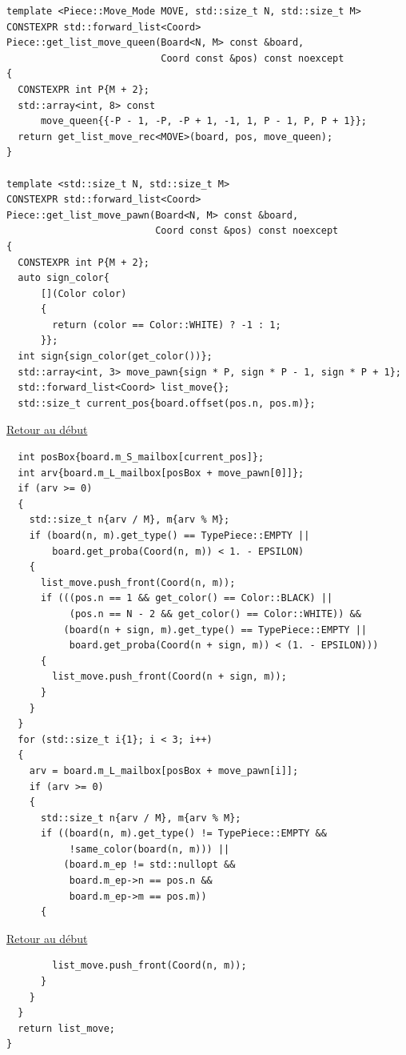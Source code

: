 {\begin{frame}[fragile]
\begin{verbatim}
template <Piece::Move_Mode MOVE, std::size_t N, std::size_t M>
CONSTEXPR std::forward_list<Coord>
Piece::get_list_move_queen(Board<N, M> const &board,
                           Coord const &pos) const noexcept
{
  CONSTEXPR int P{M + 2};
  std::array<int, 8> const
      move_queen{{-P - 1, -P, -P + 1, -1, 1, P - 1, P, P + 1}};
  return get_list_move_rec<MOVE>(board, pos, move_queen);
}

template <std::size_t N, std::size_t M>
CONSTEXPR std::forward_list<Coord>
Piece::get_list_move_pawn(Board<N, M> const &board,
                          Coord const &pos) const noexcept
{
  CONSTEXPR int P{M + 2};
  auto sign_color{
      [](Color color)
      {
        return (color == Color::WHITE) ? -1 : 1;
      }};
  int sign{sign_color(get_color())};
  std::array<int, 3> move_pawn{sign * P, sign * P - 1, sign * P + 1};
  std::forward_list<Coord> list_move{};
  std::size_t current_pos{board.offset(pos.n, pos.m)};
\end{verbatim}
\end{frame}

\begin{frame}[fragile]
\hyperlink{conclusion}{Retour au début}\newline
\begin{verbatim}
  int posBox{board.m_S_mailbox[current_pos]};
  int arv{board.m_L_mailbox[posBox + move_pawn[0]]};
  if (arv >= 0)
  {
    std::size_t n{arv / M}, m{arv % M};
    if (board(n, m).get_type() == TypePiece::EMPTY ||
        board.get_proba(Coord(n, m)) < 1. - EPSILON)
    {
      list_move.push_front(Coord(n, m));
      if (((pos.n == 1 && get_color() == Color::BLACK) ||
           (pos.n == N - 2 && get_color() == Color::WHITE)) &&
          (board(n + sign, m).get_type() == TypePiece::EMPTY ||
           board.get_proba(Coord(n + sign, m)) < (1. - EPSILON)))
      {
        list_move.push_front(Coord(n + sign, m));
      }
    }
  }
  for (std::size_t i{1}; i < 3; i++)
  {
    arv = board.m_L_mailbox[posBox + move_pawn[i]];
    if (arv >= 0)
    {
      std::size_t n{arv / M}, m{arv % M};
      if ((board(n, m).get_type() != TypePiece::EMPTY &&
           !same_color(board(n, m))) ||
          (board.m_ep != std::nullopt &&
           board.m_ep->n == pos.n &&
           board.m_ep->m == pos.m))
      {
\end{verbatim}
\end{frame}

\begin{frame}[fragile]
\hyperlink{conclusion}{Retour au début}\newline
\begin{verbatim}
        list_move.push_front(Coord(n, m));
      }
    }
  }
  return list_move;
}


\end{verbatim}
\end{frame}}
